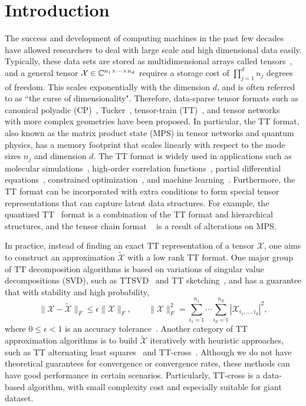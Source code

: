 \documentclass[11pt,a4paper,review]{siamart220329}
\begin{document}
\section{Introduction}\label{sec:introduction}
The success and development of computing machines in the past few decades have allowed researchers to deal with large scale and high dimensional data easily. Typically, these data sets are stored as multidimensional arrays called tensors~\cite{kolda2009tensor}, and a general tensor $\mathcal{X} \in \mathbb{C}^{n_1\times\cdots \times n_d}$ requires a storage cost of $\prod_{j=1}^d n_j$ degrees of freedom. This scales exponentially with the dimension $d$, and is often referred to as ``the curse of dimensionality". Therefore, data-sparse tensor formats such as canonical polyadic (CP)~\cite{hitchcock1927expression}, Tucker~\cite{de2000multilinear}, tensor-train (TT)~\cite{oseledets2011tensor}, and tensor networks~\cite{evenbly2011tensor} with more complex geometries have been proposed. In particular, the TT format, also known as the matrix product state (MPS) in tensor networks and quantum physics, has a memory footprint that scales linearly with respect to the mode sizes $n_j$ and dimension $d$. The TT format is widely used in applications such as molecular simulations~\cite{savostyanov2014exact}, high-order correlation functions~\cite{kressner2015low}, partial differential equations~\cite{guo2023local}, constrained optimization~\cite{dolgov2017low,benner2020low}, and machine learning~\cite{vandereycken2022ttml,novikov2020tensor}. Furthermore, the TT format can be incorporated with extra conditions to form special tensor representations that can capture latent data structures. For example, the quantized TT~\cite{dolgov2012fast} format is a combination of the TT format and hierarchical structures, and the tensor chain format ~\cite{espig2012note} is a result of alterations on MPS.

In practice, instead of finding an exact TT representation of a tensor $\mathcal{X}$, one aims to construct an approximation $\tilde{\mathcal{X}}$ with a low rank TT format. One major group of TT decomposition algorithms is based on variations of singular value decompositions (SVD), such as TTSVD~\cite{oseledets2011tensor} and TT sketching~\cite{che2019randomized}, and has a guarantee that with stability and high probability,
\begin{equation}
\| \mathcal{X} - \tilde{\mathcal{X}} \|_F \leq \epsilon \| \mathcal{X} \|_F, \qquad \|\mathcal{X}\|_F^2 = \sum_{i_1=1}^{n_1} \cdots \sum_{i_d = 1}^{n_d} |\mathcal{X}_{i_1,\ldots,i_d}|^2,
\label{eq:FrobeniusNorm}
\end{equation}
where $0\leq\epsilon<1$ is an accuracy tolerance~\cite{grasedyck2013literature,hackbusch2012tensor}. Another category of TT approximation algorithms is to build $\tilde{\mathcal{X}}$ iteratively with heuristic approaches, such as TT alternating least squares~\cite{holtz2012alternating} and TT-cross~\cite{oseledets2010tt}. Although we do not have theoretical guarantees for convergence or convergence rates, these methods can have good performance in certain scenarios. Particularly, TT-cross is a data-based algorithm, with small complexity cost and especially suitable for giant dataset.
\end{document}
